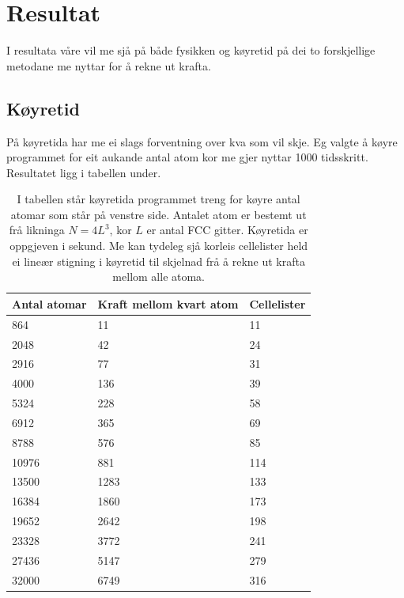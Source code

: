 \documentclass[12pt, a4paper]{article}
\theoremstyle{definition} \newtheorem*{definition}{Teorem}
\begin{document}
\section*{Resultat}
    I resultata våre vil me sjå på både fysikken og køyretid på dei to forskjellige metodane me nyttar for å rekne ut krafta.

    \subsection*{Køyretid}
        På køyretida har me ei slags forventning over kva som vil skje. Eg valgte å køyre programmet for eit aukande antal atom kor me gjer nyttar 1000 tidsskritt. Resultatet ligg
        i tabellen under.

        \begin{table}[H]
            \centering
            \begin{tabular}{|l|l|l|}
                \hline
                Antal atomar & Kraft mellom kvart atom & Cellelister \\
                \hline
                864 & 11 & 11 \\
                2048 & 42 & 24 \\
                2916 & 77 & 31 \\
                4000 & 136 & 39 \\
                5324 & 228 & 58 \\
                6912 & 365 & 69 \\
                8788 & 576 & 85 \\
                10976 & 881 & 114 \\
                13500 & 1283 & 133 \\
                16384 & 1860 & 173 \\
                19652 & 2642 & 198 \\
                23328 & 3772 & 241 \\
                27436 & 5147 & 279 \\
                32000 & 6749 & 316 \\
                \hline
            \end{tabular}
            \caption{I tabellen står køyretida programmet treng for køyre antal atomar som står på venstre side. Antalet atom er bestemt ut frå likninga
                     $N = 4L^3$, kor $L$ er antal FCC gitter. Køyretida er oppgjeven i sekund. Me kan tydeleg sjå korleis cellelister held ei lineær stigning i
                     køyretid til skjelnad frå å rekne ut krafta mellom alle atoma.}
        \end{table}
\end{document}
